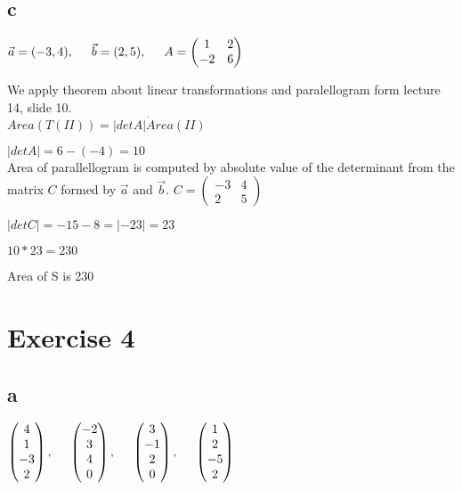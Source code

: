 \documentclass{article}
\begin{document}
\subsection*{c}
$
\vec{a} = (-3,4), \hspace{5 mm} \vec{b} = (2,5), \hspace{5 mm}
A = 
\left (
    \begin{matrix}
        1 & 2\\
        -2 & 6
    \end{matrix}
\right )
$

We apply theorem about linear transformations and paralellogram form lecture 14, slide 10.\\
$Area(T(II)) = |detA| \dot Area(II)$

$|detA| = 6-(-4) = 10$\\
Area of parallellogram is computed by absolute value of the determinant from the matrix $C$ formed by $\vec{a}$ and $\vec{b}$.
$C =
\left (
    \begin{matrix}
        -3 & 4\\
        2 & 5
    \end{matrix}
\right )
$

$|detC| = -15 - 8 = |-23| = 23$

$10*23 = 230$

Area of S is 230

\newpage

\section*{Exercise 4}

\subsection*{a}
$
\left (
    \begin{matrix}
        4\\
        1\\
        -3\\
        2
    \end{matrix}
\right )
, \hspace{5 mm}
\left (
    \begin{matrix}
        -2\\
        3\\
        4\\
        0
    \end{matrix}
\right )
, \hspace{5 mm}
\left (
    \begin{matrix}
        3\\
        -1\\
        2\\
        0
    \end{matrix}
\right )
, \hspace{5 mm}
\left (
    \begin{matrix}
        1\\
        2\\
        -5\\
        2
    \end{matrix}
\right )
$
        
\end{document}
